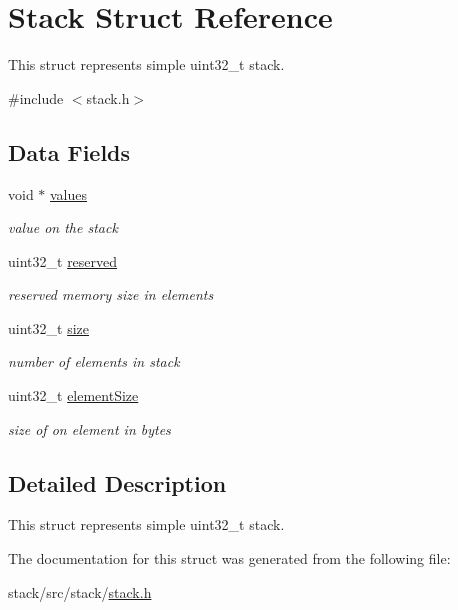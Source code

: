 \hypertarget{structStack}{}\section{Stack Struct Reference}
\label{structStack}


This struct represents simple uint32\+\_\+t stack.  




{\ttfamily \#include $<$stack.\+h$>$}

\subsection*{Data Fields}
\begin{DoxyCompactItemize}
\item 
\mbox{\label{structStack_ab477d1daabe17ea9a06bca917d31fa0b}} 
void $\ast$ \hyperlink{structStack_ab477d1daabe17ea9a06bca917d31fa0b}{values}
\begin{DoxyCompactList}\small\item\em value on the stack \end{DoxyCompactList}\item 
\mbox{\label{structStack_a67852b957af50a592ef664150864b69d}} 
uint32\+\_\+t \hyperlink{structStack_a67852b957af50a592ef664150864b69d}{reserved}
\begin{DoxyCompactList}\small\item\em reserved memory size in elements \end{DoxyCompactList}\item 
\mbox{\label{structStack_a7749b0e721f7bf75886e6474604a627f}} 
uint32\+\_\+t \hyperlink{structStack_a7749b0e721f7bf75886e6474604a627f}{size}
\begin{DoxyCompactList}\small\item\em number of elements in stack \end{DoxyCompactList}\item 
\mbox{\label{structStack_a30d2d941e3fe2500e7831a498e4b9645}} 
uint32\+\_\+t \hyperlink{structStack_a30d2d941e3fe2500e7831a498e4b9645}{element\+Size}
\begin{DoxyCompactList}\small\item\em size of on element in bytes \end{DoxyCompactList}\end{DoxyCompactItemize}


\subsection{Detailed Description}
This struct represents simple uint32\+\_\+t stack. 

The documentation for this struct was generated from the following file\+:\begin{DoxyCompactItemize}
\item 
stack/src/stack/\hyperlink{stack_8h}{stack.\+h}\end{DoxyCompactItemize}
